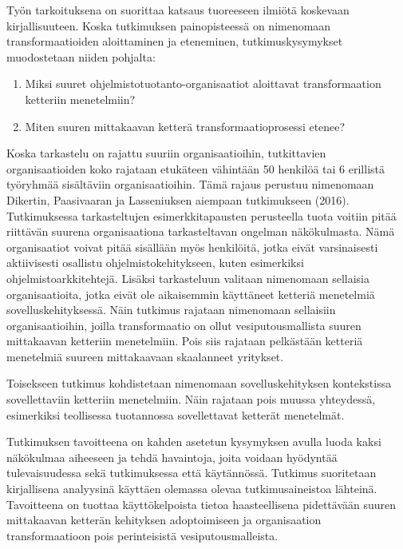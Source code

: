 Työn tarkoituksena on suorittaa katsaus tuoreeseen ilmiötä koskevaan
kirjallisuuteen. Koska tutkimuksen painopisteessä on nimenomaan
transformaatioiden aloittaminen ja eteneminen, tutkimuskysymykset
muodostetaan niiden pohjalta:

\begin{enumerate}
	\item Miksi suuret ohjelmistotuotanto-organisaatiot aloittavat
		transformaation ketteriin menetelmiin?
	\item Miten suuren mittakaavan ketterä transformaatioprosessi etenee?
\end{enumerate}

Koska tarkastelu on rajattu suuriin organisaatioihin, tutkittavien
organisaatioiden koko rajataan etukäteen vähintään 50 henkilöä tai
6 erillistä työryhmää sisältäviin organisaatioihin. Tämä rajaus
perustuu nimenomaan Dikertin, Paasivaaran ja Lasseniuksen aiempaan
tutkimukseen (2016). Tutkimuksessa tarkasteltujen esimerkkitapausten
perusteella tuota voitiin pitää riittävän suurena organisaationa
tarkasteltavan ongelman näkökulmasta. Nämä organisaatiot voivat
pitää sisällään myös henkilöitä, jotka eivät varsinaisesti
aktiivisesti osallistu ohjelmistokehitykseen, kuten esimerkiksi
ohjelmistoarkkitehtejä. Lisäksi tarkasteluun valitaan nimenomaan
sellaisia organisaatioita, jotka eivät ole aikaisemmin käyttäneet
ketteriä menetelmiä sovelluskehityksessä. Näin tutkimus rajataan
nimenomaan sellaisiin organisaatioihin, joilla transformaatio on ollut
vesiputousmallista suuren mittakaavan ketteriin menetelmiin. Pois siis
rajataan pelkästään ketteriä menetelmiä suureen mittakaavaan
skaalanneet yritykset.

Toisekseen tutkimus kohdistetaan nimenomaan sovelluskehityksen
kontekstissa sovellettaviin ketteriin menetelmiin. Näin rajataan pois
muussa yhteydessä, esimerkiksi teollisessa tuotannossa sovellettavat
ketterät menetelmät.

Tutkimuksen tavoitteena on kahden asetetun kysymyksen avulla luoda
kaksi näkökulmaa aiheeseen ja tehdä havaintoja, joita voidaan
hyödyntää tulevaisuudessa sekä tutkimuksessa että käytännössä.
Tutkimus suoritetaan kirjallisena analyysinä käyttäen olemassa olevaa
tutkimusaineistoa lähteinä. Tavoitteena on tuottaa käyttökelpoista
tietoa haasteellisena pidettävään suuren mittakaavan ketterän
kehityksen adoptoimiseen ja organisaation transformaatioon pois
perinteisistä vesiputousmalleista.
